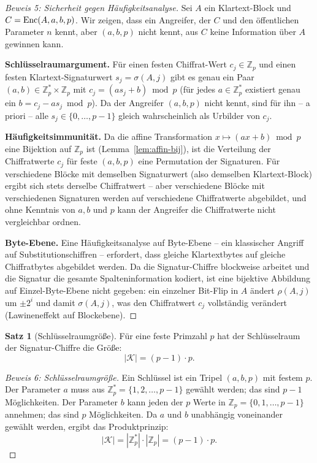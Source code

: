 ﻿\documentclass[a4paper,12pt]{scrreprt}
\theoremstyle{definition}
\newtheorem{satz}{Satz}[section]
\begin{document}
\begin{proof}[Beweis 5: Sicherheit gegen Häufigkeitsanalyse]
	Sei $A$ ein Klartext-Block und $C = \mathrm{Enc}(A, \newline a, b, p)$. Wir zeigen, dass ein Angreifer, der $C$ und den öffentlichen Parameter $n$ kennt, aber $(a, b, p)$ nicht kennt, aus $C$ keine Information über $A$ gewinnen kann.
	
	\textbf{Schlüsselraumargument.} Für einen festen Chiffrat-Wert $c_j \in \mathbb{Z}_p$ und einen festen Klartext-Signaturwert $s_j = \sigma(A,j)$ gibt es genau ein Paar $(a, b) \in \mathbb{Z}_p^* \times \mathbb{Z}_p$ mit $c_j = (a s_j + b) \bmod p$ (für jedes $a \in \mathbb{Z}_p^*$ existiert genau ein $b = c_j - a s_j \bmod p$). Da der Angreifer $(a, b, p)$ nicht kennt, sind für ihn -- a priori -- alle $s_j \in \{0, \ldots, p-1\}$ gleich wahrscheinlich als Urbilder von $c_j$.
	
	\textbf{Häufigkeitsimmunität.} Da die affine Transformation $x \mapsto (ax + b) \bmod p$ eine Bijektion auf $\mathbb{Z}_p$ ist (Lemma~\ref{lem:affin-bij}), ist die Verteilung der Chiffratwerte $c_j$ für feste $(a, b, p)$ eine Permutation der Signaturen. Für verschiedene Blöcke mit demselben Signaturwert (also demselben Klartext-Block) ergibt sich stets derselbe Chiffratwert -- aber verschiedene Blöcke mit verschiedenen Signaturen werden auf verschiedene Chiffratwerte abgebildet, und ohne Kenntnis von $a, b$ und $p$ kann der Angreifer die Chiffratwerte nicht vergleichbar ordnen.
	
	\textbf{Byte-Ebene.} Eine Häufigkeitsanalyse auf Byte-Ebene -- ein klassischer Angriff auf Substitutionschiffren -- erfordert, dass gleiche Klartextbytes auf gleiche Chiffratbytes abgebildet werden. Da die Signatur-Chiffre blockweise arbeitet und die Signatur die gesamte Spalteninformation kodiert, ist eine bijektive Abbildung auf Einzel-Byte-Ebene nicht gegeben: ein einzelner Bit-Flip in $A$ ändert $\rho(A,j)$ um $\pm 2^i$ und damit $\sigma(A,j)$, was den Chiffratwert $c_j$ vollständig verändert (Lawineneffekt auf Blockebene).
\end{proof}

\begin{satz}[Schlüsselraumgröße]
	\label{satz:schluessel}
	Für eine feste Primzahl $p$ hat der Schlüsselraum der Signatur-Chiffre die Größe:
	\[
	|\mathcal{K}| = (p-1) \cdot p.
	\]
\end{satz}

\begin{proof}[Beweis 6: Schlüsselraumgröße]
	Ein Schlüssel ist ein Tripel $(a, b, p)$ mit festem $p$. Der Parameter $a$ muss aus $\mathbb{Z}_p^* = \{1, 2, \ldots, p-1\}$ gewählt werden; das sind $p - 1$ Möglichkeiten. Der Parameter $b$ kann jeden der $p$ Werte in $\mathbb{Z}_p = \{0, 1, \ldots, p-1\}$ annehmen; das sind $p$ Möglichkeiten. Da $a$ und $b$ unabhängig voneinander gewählt werden, ergibt das Produktprinzip:
	\[
	|\mathcal{K}| = |\mathbb{Z}_p^*| \cdot |\mathbb{Z}_p| = (p-1) \cdot p.
	\]
\end{proof}
\end{document}
